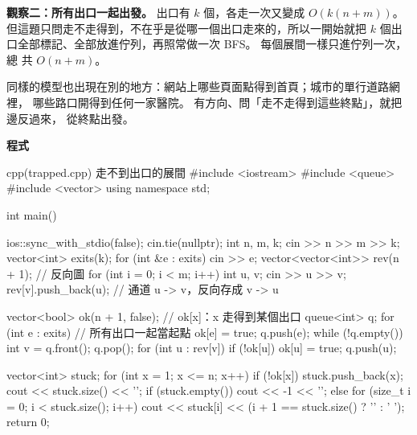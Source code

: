 \textbf{觀察二：所有出口一起出發。} 出口有 $k$ 個，各走一次又變成 $O(k(n +
m))$。 但這題只問走不走得到，不在乎是從哪一個出口走來的，所以一開始就把 $k$
個出口全部標記、全部放進佇列，再照常做一次 BFS。 每個展間一樣只進佇列一次，總
共 $O(n + m)$。

同樣的模型也出現在別的地方：網站上哪些頁面點得到首頁；城市的單行道路網裡，
哪些路口開得到任何一家醫院。 有方向、問「走不走得到這些終點」，就把邊反過來，
從終點出發。

\textbf{程式}

\begin{example}[label=ex:trapped]{cpp}{(trapped.cpp) 走不到出口的展間}
#include <iostream>
#include <queue>
#include <vector>
using namespace std;

int main() {
    ios::sync_with_stdio(false);
    cin.tie(nullptr);
    int n, m, k;
    cin >> n >> m >> k;
    vector<int> exits(k);
    for (int &e : exits) {
        cin >> e;
    }
    vector<vector<int>> rev(n + 1);          // 反向圖
    for (int i = 0; i < m; i++) {
        int u, v;
        cin >> u >> v;
        rev[v].push_back(u);                 // 通道 u -> v，反向存成 v -> u
    }

    vector<bool> ok(n + 1, false);           // ok[x]：x 走得到某個出口
    queue<int> q;
    for (int e : exits) {                    // 所有出口一起當起點
        ok[e] = true;
        q.push(e);
    }
    while (!q.empty()) {
        int v = q.front();
        q.pop();
        for (int u : rev[v]) {
            if (!ok[u]) {
                ok[u] = true;
                q.push(u);
            }
        }
    }

    vector<int> stuck;
    for (int x = 1; x <= n; x++) {
        if (!ok[x]) {
            stuck.push_back(x);
        }
    }
    cout << stuck.size() << '\n';
    if (stuck.empty()) {
        cout << -1 << '\n';
    } else {
        for (size_t i = 0; i < stuck.size(); i++) {
            cout << stuck[i] << (i + 1 == stuck.size() ? '\n' : ' ');
        }
    }
    return 0;
}
\end{example}


